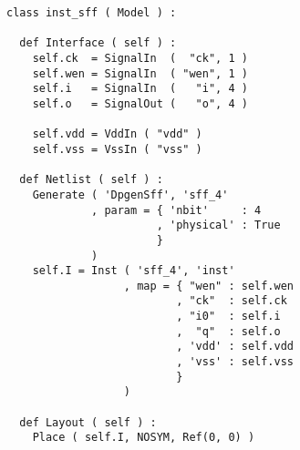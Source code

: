 \begin{itemize}
\begin{verbatim}
class inst_sff ( Model ) :

  def Interface ( self ) :
    self.ck  = SignalIn  (  "ck", 1 )
    self.wen = SignalIn  ( "wen", 1 )
    self.i   = SignalIn  (   "i", 4 )
    self.o   = SignalOut (   "o", 4 )

    self.vdd = VddIn ( "vdd" )
    self.vss = VssIn ( "vss" )
    
  def Netlist ( self ) :
    Generate ( 'DpgenSff', 'sff_4'
             , param = { 'nbit'     : 4
                       , 'physical' : True
                       }
             )
    self.I = Inst ( 'sff_4', 'inst'
                  , map = { "wen" : self.wen
                          , "ck"  : self.ck
                          , "i0"  : self.i
                          ,  "q"  : self.o
                          , 'vdd' : self.vdd
                          , 'vss' : self.vss
                          }
                  )
                
  def Layout ( self ) :
    Place ( self.I, NOSYM, Ref(0, 0) )
\end{verbatim}
\end{itemize}
